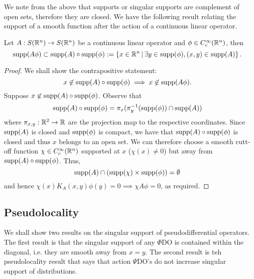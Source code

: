 \documentclass[12pt]{article}
\begin{document}
We note from the above that supports or singular supports are complement of open sets, therefore they are closed. 
We have the following result relating the support of a smooth function after the action of a continuous linear operator. 
\begin{fprop}
    Let $A: S({\mathbb R}^n) \to S({\mathbb R}^n)$ be a continuous linear operator and $\phi \in C^\infty_c({\mathbb R}^n)$, then
    \[
    \mathrm{supp}(A \phi) \subset \mathrm{supp}(A) \circ \mathrm{supp}(\phi) := \left\{x \in {\ensuremath {\mathbb R}}^n \, | \, \exists y \in \mathrm{supp}(\phi), (x, y) \in \mathrm{supp}(A) \right\}. 
    \]
\end{fprop}
\begin{proof}
    We shall show the contrapositive statement:
    \[
    x \not \in \mathrm{supp}(A) \circ \mathrm{supp}(\phi) \implies x \not \in \mathrm{supp}(A \phi). 
    \]
    Suppose $x \not \in \mathrm{supp}(A) \circ \mathrm{supp}(\phi)$. Observe that 
    \[
    \mathrm{supp}(A) \circ \mathrm{supp}(\phi) = \pi_x(\pi_y^{-1}(\mathrm{supp}(\phi)) \cap \mathrm{supp}(A))
    \]
    where $\pi_{x, y} : {\mathbb R}^2 \to {\ensuremath {\mathbb R}}$ are the projection map to the respective coordinates. Since $\mathrm{supp}(A)$ is closed and $\mathrm{supp}(\phi)$ is compact, we have that $\mathrm{supp}(A) \circ \mathrm{supp}(\phi)$ is closed and thus $x$ belongs to an open set. We can therefore choose a smooth cutt-off function $\chi \in C^\infty_c({\mathbb R}^n)$ supported at $x$ ($\chi(x) \neq 0$) but away from $\mathrm{supp}(A) \circ \mathrm{supp}(\phi)$. Thus, 
    \[
    \mathrm{supp}(A) \cap (\mathrm{supp}(\chi) \times \mathrm{supp}(\phi)) = \emptyset
    \]
    and hence $\chi(x) K_A(x, y) \phi(y) = 0 \implies \chi A \phi = 0$, as required. 
\end{proof}



\subsection{Pseudolocality} 
We shall show two results on the singular support of pseudodifferential operators. The first result is that the singular support of any $\Phi$DO is contained within the diagonal, i.e. they are smooth away from $x = y$. The second result is teh pseudolocality result that says that action $\Psi$DO's do not increase singular support of distributions. 
\end{document}
